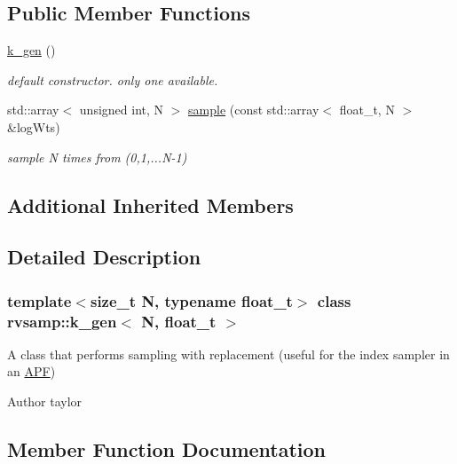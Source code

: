 \subsection*{Public Member Functions}
\begin{DoxyCompactItemize}
\item 
\mbox{\label{classrvsamp_1_1k__gen_accfb09ee03db9550cda24d4f81ac37e7}} 
\hyperlink{classrvsamp_1_1k__gen_accfb09ee03db9550cda24d4f81ac37e7}{k\+\_\+gen} ()
\begin{DoxyCompactList}\small\item\em default constructor. only one available. \end{DoxyCompactList}\item 
std\+::array$<$ unsigned int, N $>$ \hyperlink{classrvsamp_1_1k__gen_ac7bc64186ad0696b33e67c4b3e2218d9}{sample} (const std\+::array$<$ float\+\_\+t, N $>$ \&log\+Wts)
\begin{DoxyCompactList}\small\item\em sample N times from (0,1,...N-\/1) \end{DoxyCompactList}\end{DoxyCompactItemize}
\subsection*{Additional Inherited Members}


\subsection{Detailed Description}
\subsubsection*{template$<$size\+\_\+t N, typename float\+\_\+t$>$\newline
class rvsamp\+::k\+\_\+gen$<$ N, float\+\_\+t $>$}

A class that performs sampling with replacement (useful for the index sampler in an \hyperlink{classAPF}{A\+PF}) 

\begin{DoxyAuthor}{Author}
taylor 
\end{DoxyAuthor}


\subsection{Member Function Documentation}
\mbox{\label{classrvsamp_1_1k__gen_ac7bc64186ad0696b33e67c4b3e2218d9}} 
